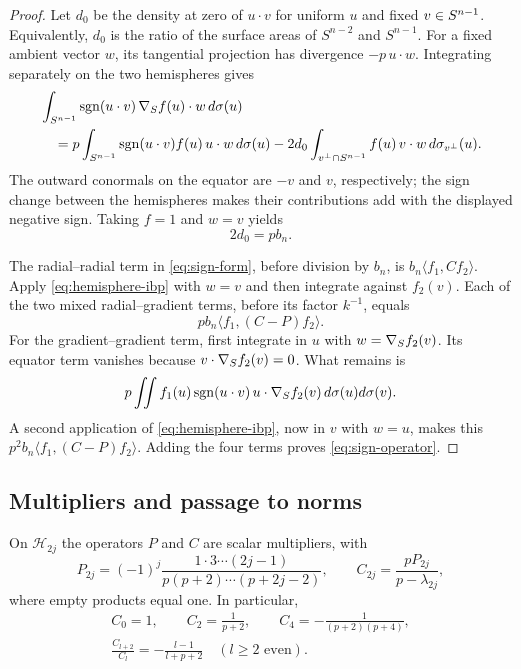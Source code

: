 \begin{proof}
Let $d_0$ be the density at zero of $u\cdot v$ for uniform $u$ and fixed
$v\in S^{n-1}$.  Equivalently, $d_0$ is the ratio of the surface areas of
$S^{n-2}$ and $S^{n-1}$.  For a fixed ambient vector $w$, its tangential
projection has divergence $-p\,u\cdot w$.  Integrating separately on
the two hemispheres gives
\begin{align}
 &\int_{S^{n-1}}\operatorname{sgn}(u\cdot v)\,\nabla_S f(u)\cdot w\,d\sigma(u)
 \notag\\
 &\quad=p\int_{S^{n-1}}\operatorname{sgn}(u\cdot v)f(u)\,u\cdot w\,d\sigma(u)
 -2d_0\int_{v^\perp\cap S^{n-1}}f(u)\,v\cdot w
       \,d\sigma_{v^\perp}(u).
 \label{eq:hemisphere-ibp}
\end{align}
The outward conormals on the equator are $-v$ and $v$, respectively;
the sign change between the hemispheres makes their contributions
add with the displayed negative sign.  Taking $f=1$ and $w=v$ yields
\[
 2d_0=p b_n.
\]

The radial--radial term in \eqref{eq:sign-form}, before division by
$b_n$, is $b_n\langle f_1,Cf_2\rangle$.  Apply
\eqref{eq:hemisphere-ibp} with $w=v$ and then integrate against
$f_2(v)$.  Each of the two mixed radial--gradient terms, before its
factor $k^{-1}$, equals
\[
 p b_n\langle f_1,(C-P)f_2\rangle.
\]
For the gradient--gradient term, first integrate in $u$ with
$w=\nabla_S f_2(v)$.  Its equator term vanishes because
$v\cdot\nabla_S f_2(v)=0$.  What remains is
\[
 p\iint f_1(u)\operatorname{sgn}(u\cdot v)\,
      u\cdot\nabla_S f_2(v)\,d\sigma(u)d\sigma(v).
\]
A second application of \eqref{eq:hemisphere-ibp}, now in $v$ with
$w=u$, makes this $p^2b_n\langle f_1,(C-P)f_2\rangle$.
Adding the four terms proves \eqref{eq:sign-operator}.
\end{proof}

\subsection{Multipliers and passage to norms}

\begin{lemma}\label{lem:spherical-multipliers}
On $\mathcal H_{2j}$ the operators $P$ and $C$ are scalar multipliers,
with
\begin{equation}\label{eq:transform-multipliers}
 P_{2j}=(-1)^j
 \frac{1\cdot3\cdots(2j-1)}{p(p+2)\cdots(p+2j-2)},
 \qquad
 C_{2j}=\frac{pP_{2j}}{p-\lambda_{2j}},
\end{equation}
where empty products equal one.  In particular,
\begin{equation}\label{eq:cosine-recurrence}
 \begin{gathered}
 C_0=1,\qquad C_2=\frac1{p+2},\qquad
 C_4=-\frac1{(p+2)(p+4)},\\[3pt]
 \frac{C_{l+2}}{C_l}=-\frac{l-1}{l+p+2}\quad(l\ge2\text{ even}).
 \end{gathered}
\end{equation}
\end{lemma}


